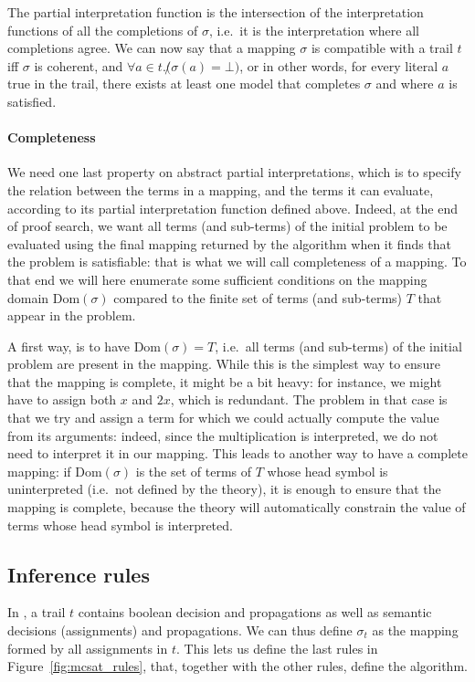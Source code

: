 \documentclass{article}
\begin{document}
The partial interpretation function is the intersection of the interpretation
functions of all the completions of $\sigma$, i.e.~it is the interpretation
where all completions agree. We can now say that a mapping $\sigma$ is compatible
with a trail $t$ iff $\sigma$ is coherent, and
$\forall a \in t. \not (\sigma(a) = \bot)$, or in other words, for every literal $a$
true in the trail, there exists at least one model that completes $\sigma$ and where
$a$ is satisfied.

\paragraph{Completeness}
We need one last property on abstract partial interpretations, which is to
specify the relation between the terms in a mapping, and the terms it can evaluate,
according to its partial interpretation function defined above. Indeed, at the end
of proof search, we want all terms (and sub-terms) of the initial problem to be
evaluated using the final mapping returned by the algorithm when it finds that the
problem is satisfiable: that is what we will call completeness of a mapping.
To that end we will here enumerate some sufficient conditions on the mapping domain
$\text{Dom}(\sigma)$ compared to the finite set of terms (and sub-terms) $T$ that
appear in the problem.

A first way, is to have $\text{Dom}(\sigma) = T$, i.e.~all terms (and sub-terms) of the
initial problem are present in the mapping. While this is the simplest way to ensure that
the mapping is complete, it might be a bit heavy: for instance, we might have to assign
both $x$ and $2x$, which is redundant. The problem in that case is that we try and assign
a term for which we could actually compute the value from its arguments: indeed,
since the multiplication is interpreted, we do not need to interpret it in our mapping.
This leads to another way to have a complete mapping: if $\text{Dom}(\sigma)$ is the
set of terms of $T$ whose head symbol is uninterpreted (i.e.~not defined by the theory),
it is enough to ensure that the mapping is complete, because the theory will automatically
constrain the value of terms whose head symbol is interpreted.

\subsection{Inference rules}

In \mcsat{}, a trail $t$ contains boolean decision and propagations as well as semantic
decisions (assignments) and propagations. We can thus define $\sigma_t$ as the mapping
formed by all assignments in $t$. This lets us define the last rules in Figure~\ref{fig:mcsat_rules},
that, together with the other rules, define the \mcsat{} algorithm.





\clearpage
\appendix
\end{document}
